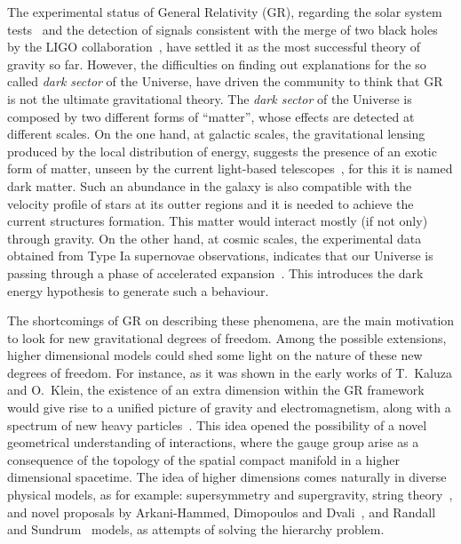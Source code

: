 \documentclass[aps,prd,12pt,superscriptaddress,showpacs,showkeys,longbibliography,reprint,nofootinbib]{revtex4-1}
\begin{document}
The experimental status of General Relativity (GR), regarding the solar system tests~\cite{Will:2014kxa} and the detection of signals consistent with the merge of two black holes by the LIGO collaboration~\cite{Abbott:2016blz,Abbott:2016nmj}, have settled it as the most successful theory of gravity so far. However, the difficulties on finding out explanations for the so called \emph{dark sector} of the Universe,
have driven the community to think that GR is not the ultimate gravitational theory. 
The \emph{dark sector} of the Universe is composed by two different forms of ``matter'', whose effects are detected at different scales. On the one hand, at galactic scales, the gravitational lensing produced by the local distribution of energy, suggests the presence of an exotic form of matter, unseen by the current light-based telescopes~\cite{Sofue:2000jx}, for this it is named dark matter. Such an abundance in the galaxy is also compatible with the velocity profile of stars at its outter regions and it is needed to achieve the current structures formation. This matter would interact mostly (if not only) through gravity. On the other hand, at cosmic scales, the experimental data obtained from Type Ia supernovae observations, indicates that our Universe is passing through a phase of accelerated expansion~\cite{Riess:1998cb}. This introduces the dark energy hypothesis to generate such a behaviour. 

The shortcomings of GR on describing these phenomena, are the main motivation to look for new gravitational degrees of freedom. Among the possible extensions, higher dimensional models could shed some light on the nature of these new degrees of freedom. For instance, as it was shown in the early works of T.~Kaluza and O.~Klein, the existence of an extra dimension within the GR framework would give rise to a unified picture of gravity and electromagnetism, along with a spectrum of new heavy particles~\cite{Kaluza:1921tu,*Klein:1926tv}. This idea opened the possibility of a novel geometrical understanding of interactions, where the gauge group arise as a consequence of the topology of the spatial compact manifold in a higher dimensional spacetime. The idea of higher dimensions comes naturally in diverse physical models, as for example: supersymmetry and supergravity, string theory~\cite{Green:1987sp,*Green:1987mn}, and novel proposals by Arkani-Hammed, Dimopoulos and Dvali~\cite{ArkaniHamed:1998rs,*Antoniadis:1998ig}, and Randall and Sundrum~\cite{Randall:1999ee,*Randall:1999vf} models, as attempts of solving the hierarchy problem.
\end{document}
